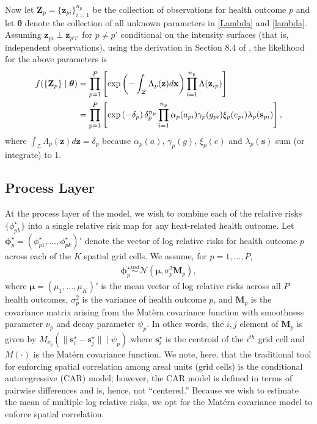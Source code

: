 \documentclass[final]{statsoc}
\begin{document}
Now let $\mathbf{Z}_p = \{\mathbf{z}_{pi}\}_{i=1}^{n_p}$ be the collection of observations for
health outcome $p$ and let $\boldsymbol{\theta}$ denote the collection of all unknown parameters 
in \eqref{Lambda} and \eqref{lambda}.  Assuming $\mathbf{z}_{pi} \perp \mathbf{z}_{p'i'}$ for
 $p \neq p'$ conditional on the intensity surfaces (that is, independent observations),  
using the derivation in Section 8.4 of \cite{Banerjee2014}, the likelihood for the 
above parameters is
\begin{align}
f(\{\mathbf{Z}_p\} \mid \boldsymbol{\theta}) &=  \prod_{p=1}^P\left[\exp\left(-\int_\mathcal{Z}\Lambda_p
(\mathbf{z})d\mathbf{x}\right)\prod_{i=1}^{n_p}\Lambda(\mathbf{z}_{ip})\right] \notag \\
&= \prod_{p=1}^P\left[\exp\left(-\delta_p\right)\delta_p^{n_p}\prod_{i=1}^{n_p}
\alpha_p(a_{pi})\gamma_p(g_{pi})\xi_p(e_{pi})\lambda_p(\mathbf{s}_{pi})\right],
\label{likelihood}
\end{align}
where $\int_{\mathcal{Z}}\Lambda_p(\mathbf{z})d\mathbf{z} = \delta_p$ because $\alpha_p(a)$, 
$\gamma_p(g)$, $\xi_p(e)$ and $\lambda_p(\mathbf{s})$ sum (or integrate) to 1.


\subsection{Process Layer}\label{process}
At the process layer of the model, we wish to combine each of the relative risks 
$\{\phi_{pk}^\star\}$ into a single relative risk map for any heat-related health outcome. 
Let $\boldsymbol{\phi}^\star_{p} = (\phi^\star_{p1}, \dots, 
\phi^\star_{pk})'$ denote the vector of log relative risks for health outcome 
$p$ across each of the $K$ spatial grid cells.  We assume, for $p=1,\dots,P$,
\begin{align} 
\boldsymbol{\phi}_p^\star \overset{ind}{\sim} \mathcal{N}\left(\boldsymbol\mu, \sigma^2_p\mathbf{M}_p\right),
\label{phiprior}
\end{align}
where $\boldsymbol{\mu} = (\mu_1,\dots,\mu_K)'$ is the mean vector of log relative risks
across all $P$ health outcomes, $\sigma^2_p$ is the variance of health outcome 
$p$, and $\mathbf{M}_p$ is the covariance matrix arising from the Mat\`{e}rn covariance 
function with smoothness parameter $\nu_p$ and decay parameter $\psi_p$. In other 
words, the $i,j$ element of $\mathbf{M}_p$ is given by $M_{\nu_p}(\|\mathbf{s}_i^\star - 
\mathbf{s}_j^\star\| \mid \psi_p)$ where $\mathbf{s}^\star_i$ is the centroid of the $i^{th}$ 
grid cell and $M(\cdot)$ is the Mat\'{e}rn covariance function.  We note, here, that 
the traditional tool for enforcing spatial correlation among areal units (grid cells) 
is the conditional autoregressive (CAR) model; however, the CAR model is defined in terms 
of pairwise differences and is, hence, not ``centered.''  Because we wish to estimate 
the mean of multiple log relative risks, we opt for the Mat\'{e}rn covariance model to 
enforce spatial correlation.
\end{document}
